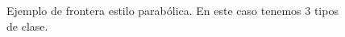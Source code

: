 \begin{center}
\begin{figure}[!htb]\centering
   \begin{minipage}{0.49\textwidth}
     \caption{Ejemplo de frontera estilo parabólica. En este caso tenemos 3 tipos de clase.}\label{Fig:Data1}
   \end{minipage}
\end{figure}
\end{center}

